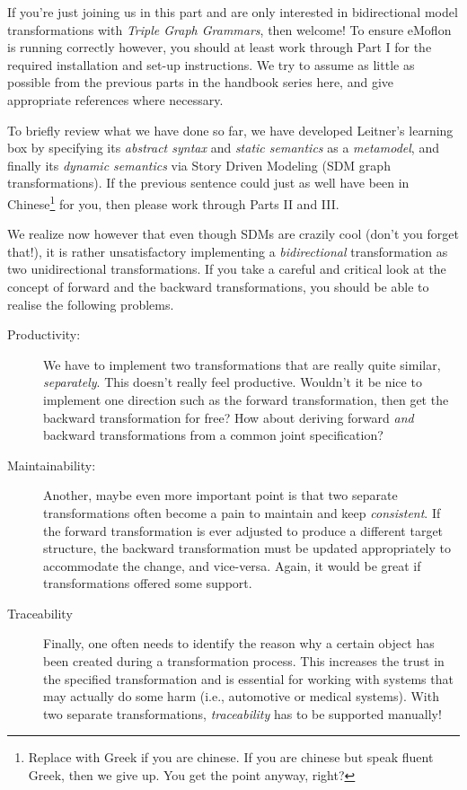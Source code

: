 \genHeader
\label{chap:Learning-Box-to-Dictionary-and-Back-Again}


If you're just joining us in this part and are only interested in bidirectional model transformations with \emph{Triple Graph Grammars}, then welcome!
To ensure eMoflon is running correctly however, you should at least work through Part I for the required installation and set-up instructions. We try to assume
as little as possible from the previous parts in the handbook series here, and give appropriate references where necessary.

To briefly review what we have done so far, we have developed Leitner's learning box by specifying its \emph{abstract syntax} and \emph{static
semantics} as a \emph{metamodel}, and finally its \emph{dynamic semantics} via Story Driven Modeling (SDM graph transformations). If the previous sentence could
just as well have been in Chinese\footnote{Replace with Greek if you are chinese.  If you are chinese but speak fluent Greek, then we give up. You get the point
anyway, right?} for you, then please work through Parts II and III.

We realize now however that even though SDMs are crazily cool (don't you forget that!), it is rather unsatisfactory implementing a \emph{bidirectional}
transformation as two unidirectional transformations. If you take a careful and critical look at the concept of forward and the backward transformations, you
should be able to realise the following problems.

\begin{description}
\item[Productivity:] We have to implement two transformations that are really quite similar, \emph{separately}. This doesn't really feel productive.
Wouldn't it be nice to implement one direction such as the forward transformation, then get the backward transformation for free? How about deriving
forward \emph{and} backward transformations from a common joint specification?

\item[Maintainability:] Another, maybe even more important point is that two separate transformations often become a pain to maintain and keep
\emph{consistent}. If the forward transformation is ever adjusted to produce a different target structure, the backward transformation must be updated
appropriately to accommodate the change, and vice-versa.  Again, it would be great if transformations offered some support.

\item[Traceability] Finally, one often needs to identify the reason why a certain object has been created during a transformation process. This increases the
trust in the specified transformation and is essential for working with systems that may actually do some harm (i.e., automotive or medical     
systems). With two separate transformations, \emph{traceability} has to be supported manually!
\end{description}

